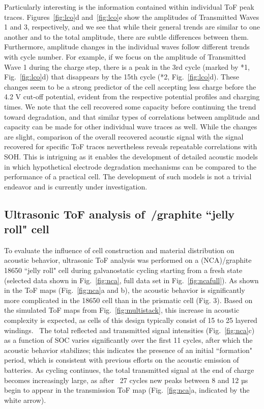 Particularly interesting is the information contained within individual ToF peak traces. Figures~\ref{fig:lco}d and~\ref{fig:lco}e show the amplitudes of Transmitted Waves 1 and 3, respectively, and we see that while their general trends are similar to one another and to the total amplitude, there are subtle differences between them. Furthermore, amplitude changes in the individual waves follow different trends with cycle number. For example, if we focus on the amplitude of Transmitted Wave 1 during the charge step, there is a peak in the 3rd cycle (marked by *1, Fig.~\ref{fig:lco}d) that disappears by the 15th cycle (*2, Fig.~\ref{fig:lco}d). These changes seem to be a strong predictor of the cell accepting less charge before the 4.2 V cut-off potential, evident from the respective potential profiles and charging times. We note that the cell recovered some capacity before continuing the trend toward degradation, and that similar types of correlations between amplitude and capacity can be made for other individual wave traces as well. While the changes are slight, comparison of the overall recovered acoustic signal with the signal recovered for specific ToF traces nevertheless reveals repeatable correlations with SOH. This is intriguing as it enables the development of detailed acoustic models in which hypothetical electrode degradation mechanisms can be compared to the performance of a practical cell. The development of such models is not a trivial endeavor and is currently under investigation.


\subsection{Ultrasonic ToF analysis of~/graphite ``jelly roll" cell}

To evaluate the influence of cell construction and material distribution on acoustic behavior, ultrasonic ToF analysis was performed on a  (NCA)/graphite 18650 ``jelly roll" cell during galvanostatic cycling starting from a fresh state (selected data shown in Fig.~\ref{fig:nca}, full data set in Fig.~\ref{fig:ncafull}). As shown in the ToF maps (Fig.~\ref{fig:nca}a and b), the acoustic behavior is significantly more complicated in the 18650 cell than in the prismatic cell (Fig. 3). Based on the simulated ToF maps from Fig.~\ref{fig:multistack}, this increase in acoustic complexity is expected, as cells of this design typically consist of 15 to 25 layered windings.~\cite{linden} The total reflected and transmitted signal intensities (Fig.~\ref{fig:nca}c) as a function of SOC varies significantly over the first 11 cycles, after which the acoustic behavior stabilizes; this indicates the presence of an initial “formation" period, which is consistent with previous efforts on the acoustic emission of batteries.\cite{Komagata2010-sw,Rhodes2010-nr} As cycling continues, the total transmitted signal at the end of charge becomes increasingly large, as after ~27 cycles new peaks between 8 and 12 µs begin to appear in the transmission ToF map (Fig.~\ref{fig:nca}a, indicated by the white arrow).

